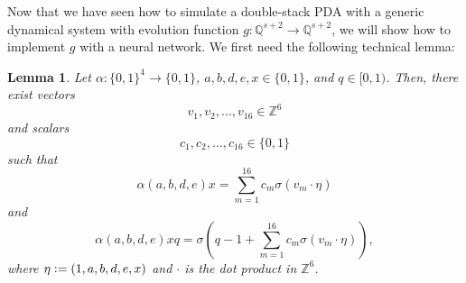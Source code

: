 \documentclass{book}
\newcommand{\defeq}{\vcentcolon=}
\newcommand{\Q}{\mathbb{Q}}
\theoremstyle{definition}
\theoremstyle{plain}
\theoremstyle{plain}
\newtheorem{lemma}[theorem]{Lemma}
\theoremstyle{remark}
\theoremstyle{plain}
\begin{document}
	Now that we have seen how to simulate a double-stack PDA with a generic dynamical system with evolution function $g:\Q^{s+2}\to\Q^{s+2}$, we will show how to implement $g$ with a neural network. We first need the following technical lemma:
	
	\begin{lemma} \label{theo:lemma}
		Let $\alpha:\{0,1\}^4\to\{0,1\}$, $a,b,d,e,x\in\{0,1\}$, and $q\in[0,1)$. Then, there exist vectors $$v_1,v_2,\dots,v_{16}\in\mathbb{Z}^6$$ and scalars $$c_1,c_2,\dots,c_{16}\in\{0,1\}$$ such that
		\begin{equation}
			\alpha(a,b,d,e)x=\sum_{m=1}^{16}c_m\sigma(v_m\cdot\eta) \label{eq:lemmaState}
		\end{equation}
		and
		$$
			\alpha(a,b,d,e)xq=\sigma\!\left(q-1+\sum_{m=1}^{16}c_m\sigma(v_m\cdot\eta)\right),
		$$
		where $\eta\defeq(1,a,b,d,e,x)$ and $\cdot$ is the dot product in $\mathbb{Z}^6$.
	\end{lemma}
	
\end{document}
